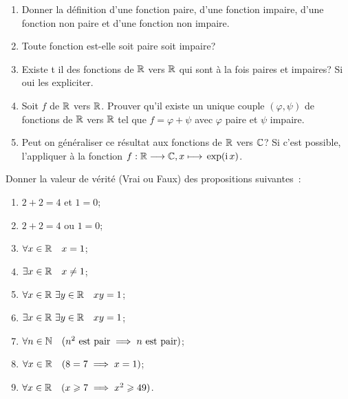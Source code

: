 \begin{exercice}
  \begin{enumerate}
    \item Donner la définition d'une fonction paire, d'une fonction impaire,
      d'une fonction non paire et d'une fonction non impaire.
    \item Toute fonction est-elle soit paire soit impaire?
    \item Existe t il des fonctions de \(\mathbb{R}\) vers \(\mathbb{R}\) qui sont à la fois
      paires  et impaires? Si oui les expliciter.
    \item Soit \(f\) de \(\mathbb{R}\) vers \(\mathbb{R}\). Prouver qu'il existe un unique
      couple \((\varphi, \psi)\) de fonctions de \(\mathbb{R}\) vers \(\mathbb{R}\) tel que
      \(f=\varphi+\psi\) avec \(\varphi\) paire et \(\psi\) impaire.
    \item Peut on généraliser ce résultat aux fonctions de \(\mathbb{R}\) vers \(\mathbb{C}\)?
      Si c'est possible, l'appliquer à la fonction
      \(f:\mathbb{R} \longrightarrow{} \mathbb{C}, x \longmapsto{} \exp(\operatorname{i} x)\).
  \end{enumerate}
\end{exercice}

\begin{exercice}
  Donner la valeur de vérité (Vrai ou Faux) des propositions suivantes~:
  \begin{enumerate}
    \item \(2+2=4\) et \(1=0\);
    \item \(2+2=4\) ou \(1=0\);
    \item \(\forall x \in \mathbb{R} \quad x=1\);
    \item \(\exists x \in \mathbb{R} \quad x\neq 1\);
    \item \(\forall x \in \mathbb{R} \ \exists y \in \mathbb{R} \quad xy=1\);
    \item \(\exists x \in \mathbb{R} \ \exists y \in \mathbb{R} \quad xy=1\);
    \item \(\forall n \in \mathbb{N} \quad (n^2 \textrm{~est pair} \implies n
      \textrm{~est pair})\);
    \item \(\forall x \in \mathbb{R} \quad (8=7 \implies x=1)\);
    \item \(\forall x \in \mathbb{R} \quad (x \geqslant 7 \implies x^2 \geqslant 49)\).
  \end{enumerate}
\end{exercice}
